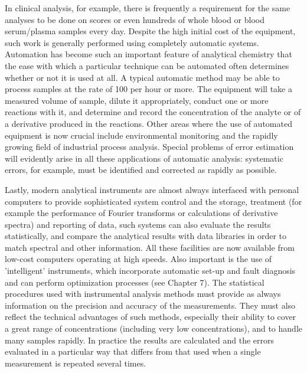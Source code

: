 In clinical analysis, for example, there is frequently a requirement for the same analyses to be done on scores or even hundreds of whole blood or blood serum/plasma samples every day. Despite the high initial cost of the equipment, such work is generally performed using completely automatic systems.
Automation has become such an important feature of analytical chemistry that the ease with which a particular technique can be automated often determines whether or not it is used at all. A typical automatic method may be able to process samples at the rate of 100 per hour or more. The equipment will take a measured volume of sample, dilute it appropriately, conduct one or more reactions with it, and determine and record the concentration of the analyte or of a derivative produced in the reactions.
Other areas where the use of automated equipment is now crucial include environmental monitoring and the rapidly growing field of industrial process analysis. Special problems of error estimation will evidently arise in all these applications of automatic analysis: systematic errors, for example, must be identified and corrected as rapidly as possible.

Lastly, modern analytical instruments are almost always interfaced with personal computers to provide sophisticated system control and the storage, treatment (for example the performance of Fourier transforms or calculations of derivative spectra) and reporting of data, such systems can also evaluate the results statistically, and compare the analytical results with data libraries in order to match spectral and other information.
All these facilities are now available from low-cost computers operating at high speeds.
Also important is the use of 'intelligent' instruments, which incorporate automatic set-up and fault diagnosis and can perform optimization processes (see Chapter 7).
The statistical procedures used with instrumental analysis methods must provide as always information on the precision and accuracy of the measurements. They must also reflect the technical advantages of such methods, especially their ability to cover a great range of concentrations (including very low concentrations), and to handle many samples rapidly.
In practice the results are calculated and the errors evaluated in a particular way that differs from that used when a single measurement is repeated several times.



